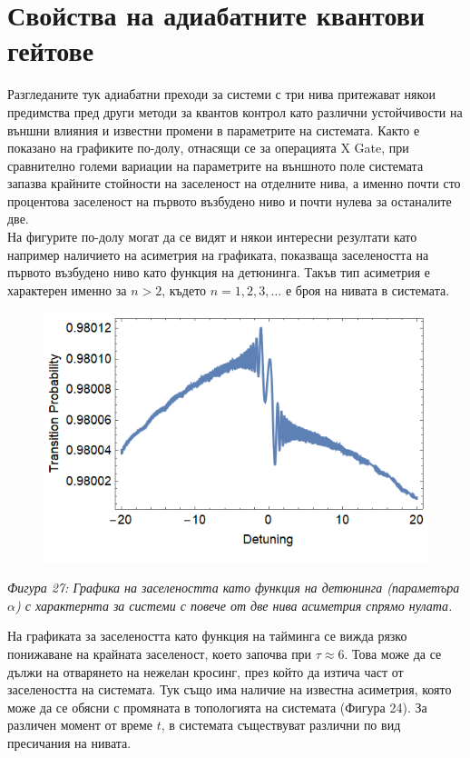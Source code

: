     \section{Свойства на адиабатните квантови гейтове}

    Разгледаните тук адиабатни преходи за системи с три нива притежават някои предимства пред други методи за квантов контрол
    като различни устойчивости на външни влияния и известни промени в параметрите на системата. Както е показано на графиките
    по-долу, отнасящи се за операцията X Gate, при сравнително големи вариации на параметрите на външното поле системата запазва
    крайните стойности на заселеност на отделните нива, а именно почти сто процентова заселеност на първото възбудено ниво и почти
    нулева за останалите две.\\
    На фигурите по-долу могат да се видят и някои интересни резултати като например наличието на асиметрия на графиката, показваща заселеността на
    първото възбудено ниво като функция на детюнинга. Такъв тип асиметрия е характерен именно за $n > 2$, където $n = 1, 2, 3, \dots$ е броя на нивата в системата.

    \begin{figure}[H]
        \centering
        \includegraphics[width=350pt]{29.png}
    \end{figure}
    \begin{center}
        \small \textit{Фигура 27: Графика на заселеността като функция на детюнинга (параметъра $\alpha$) с характернта за системи с повече от две нива
        асиметрия спрямо нулата.}
    \end{center}

    На графиката за заселеността като функция на тайминга се вижда рязко понижаване на крайната заселеност, което започва при $\tau \approx 6$. Това може да се дължи на
    отварянето на нежелан кросинг, през който да изтича част от заселеността на системата. Тук също има наличие на известна асиметрия, която може да се обясни с промяната
    в топологията на системата (Фигура 24). За различен момент от време $t$, в системата съществуват различни по вид пресичания на нивата.


